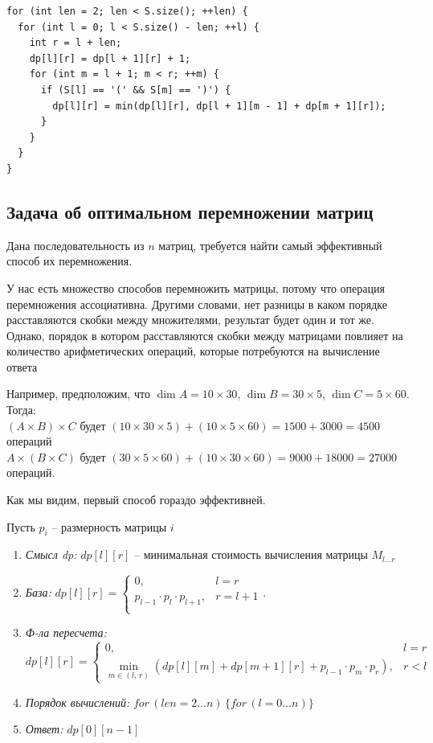 \begin{lstlisting}
for (int len = 2; len < S.size(); ++len) {
  for (int l = 0; l < S.size() - len; ++l) {
    int r = l + len;
    dp[l][r] = dp[l + 1][r] + 1;
    for (int m = l + 1; m < r; ++m) {
      if (S[l] == '(' && S[m] == ')') {
        dp[l][r] = min(dp[l][r], dp[l + 1][m - 1] + dp[m + 1][r]);
      }
    }
  }
}
\end{lstlisting}

\subsection*{Задача об оптимальном перемножении матриц}

\Task Дана последовательность из $n$ матриц, требуется найти самый эффективный способ их перемножения.

У нас есть множество способов перемножить матрицы, потому что операция перемножения ассоциативна. Другими словами, нет разницы в каком порядке расставляются скобки между множителями, результат будет один и тот же. Однако, порядок в котором расставляются скобки между матрицами повлияет на количество арифметических операций, которые потребуются на вычисление ответа

Например, предположим, что $\dim{A}= 10 \times 30$, $\dim{B} = 30 \times 5$, $\dim{C} = 5 \times 60$. Тогда:\\
 $(A \times B)\times C$ будет $(10\times30\times5) + (10\times5\times60)  = 1500 + 3000 = 4500$ операций \\
 $ A \times(B \times C)$ будет $(30\times5\times60) + (10\times30\times60) = 9000 + 18000 = 27000$ операций.

Как мы видим, первый способ гораздо эффективней. 

\Solve 

Пусть $p_i$ -- размерность матрицы $i$

\begin{enumerate}
    \item \textit{Смысл dp:} $dp[l][r]$ -- минимальная стоимость вычисления матрицы $M_{l \dots r}$
    \item \textit{База:} $dp[l][r] = 
    \begin{cases}
    0, & l = r\\
    p_{l-1} \cdot p_{l} \cdot p_{l+1}, & r = l + 1\\
    \end{cases}$.
    \item \textit{Ф-ла пересчета:} $dp[l][r] = 
        \begin{cases}
        0, & l = r\\
        \min\limits_{m \in (l,\,r)} ( dp[l][m] + dp[m + 1][r] + p_{l-1} \cdot p_m \cdot p_r), & r < l
        \end{cases}$
    \item \textit{Порядок вычислений:} $for\,(len=2 \dots n)\, \{ for\,(l = 0 \dots n) \}$
    \item \textit{Ответ:} $dp[0][n-1]$
\end{enumerate}

